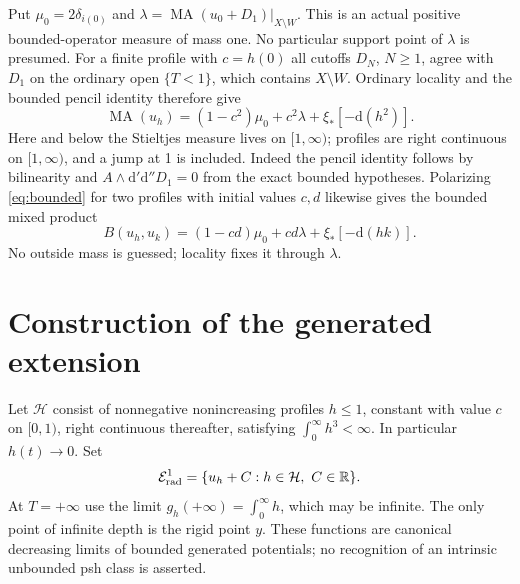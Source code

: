 \documentclass[11pt]{article}
\newcommand{\MA}{\operatorname{MA}}
\newcommand{\R}{\mathbb R}
\begin{document}
Put $\mu_0=2\delta_{i(0)}$ and
$\lambda=\MA(u_0+D_1)|_{X\setminus W}$. This is an actual positive
bounded-operator measure of mass one. No particular support point of
$\lambda$ is presumed. For a finite profile with $c=h(0)$ all cutoffs
$D_N$, $N\geq1$, agree with $D_1$ on the ordinary open $\{T<1\}$,
which contains $X\setminus W$. Ordinary locality and the bounded pencil
identity therefore give
\begin{equation}\label{eq:bounded}
 \MA(u_h)=(1-c^2)\mu_0+c^2\lambda+\xi_*[-\mathrm d(h^2)].
\end{equation}
Here and below the Stieltjes measure lives on $[1,\infty)$; profiles are
right continuous on $[1,\infty)$, and a jump at 1 is included.
Indeed the pencil identity follows by bilinearity and
$A\wedge\mathrm d'\mathrm d''D_1=0$ from the exact bounded hypotheses.
Polarizing \eqref{eq:bounded} for two profiles with initial values $c,d$
likewise gives the bounded mixed product
\begin{equation}\label{eq:mixed}
 B(u_h,u_k)=(1-cd)\mu_0+cd\lambda+\xi_*[-\mathrm d(hk)].
\end{equation}
No outside mass is guessed; locality fixes it through $\lambda$.

\section{Construction of the generated extension}
Let $\mathcal H$ consist of nonnegative nonincreasing profiles $h\leq1$,
constant with value $c$ on $[0,1)$, right continuous thereafter, satisfying
$\int_0^\infty h^3<\infty$. In particular $h(t)\to0$.
Set
\[
 \mathcal E^1_{\rm rad}=\{u_h+C:h\in\mathcal H,\ C\in\R\}.
\]
At $T=+\infty$ use the limit $g_h(+\infty)=\int_0^\infty h$, which may
be infinite. The only point of infinite depth is the rigid point $y$.
These functions are canonical decreasing limits of bounded generated
potentials; no recognition of an intrinsic unbounded psh class is asserted.
\end{document}
